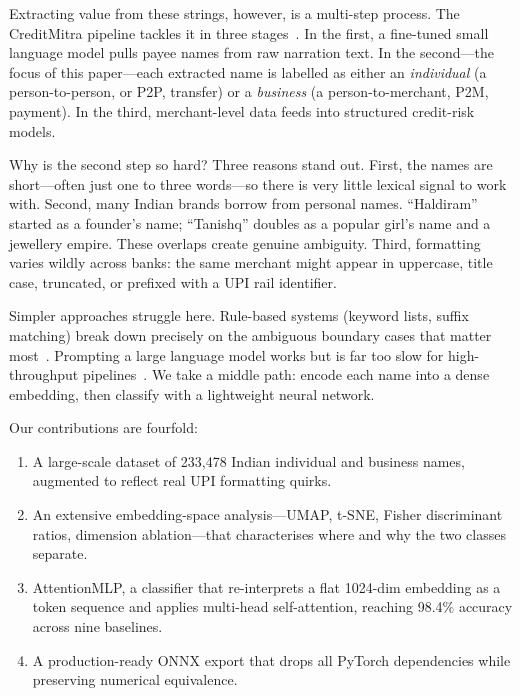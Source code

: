 \documentclass[conference]{IEEEtran}
\begin{document}
Extracting value from these strings, however, is a multi-step process. The CreditMitra pipeline tackles it in three stages~\cite{dpqlora_paper}. In the first, a fine-tuned small language model pulls payee names from raw narration text. In the second---the focus of this paper---each extracted name is labelled as either an \emph{individual} (a person-to-person, or P2P, transfer) or a \emph{business} (a person-to-merchant, P2M, payment). In the third, merchant-level data feeds into structured credit-risk models.

Why is the second step so hard? Three reasons stand out. First, the names are short---often just one to three words---so there is very little lexical signal to work with. Second, many Indian brands borrow from personal names. ``Haldiram'' started as a founder's name; ``Tanishq'' doubles as a popular girl's name and a jewellery empire. These overlaps create genuine ambiguity. Third, formatting varies wildly across banks: the same merchant might appear in uppercase, title case, truncated, or prefixed with a UPI rail identifier.

Simpler approaches struggle here. Rule-based systems (keyword lists, suffix matching) break down precisely on the ambiguous boundary cases that matter most~\cite{nadeau2007ner_survey}. Prompting a large language model works but is far too slow for high-throughput pipelines~\cite{brown2020gpt3}. We take a middle path: encode each name into a dense embedding, then classify with a lightweight neural network.

Our contributions are fourfold:
\begin{enumerate}[leftmargin=*]
  \item A large-scale dataset of 233{,}478 Indian individual and business names, augmented to reflect real UPI formatting quirks.
  \item An extensive embedding-space analysis---UMAP, t-SNE, Fisher discriminant ratios, dimension ablation---that characterises where and why the two classes separate.
  \item AttentionMLP, a classifier that re-interprets a flat 1024-dim embedding as a token sequence and applies multi-head self-attention, reaching 98.4\% accuracy across nine baselines.
  \item A production-ready ONNX export that drops all PyTorch dependencies while preserving numerical equivalence.
\end{enumerate}

\end{document}
